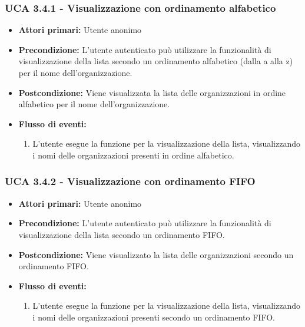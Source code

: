 \subsubsection{UCA 3.4.1 - Visualizzazione con ordinamento alfabetico}%
\begin{itemize}
	\item \textbf{Attori primari:} Utente anonimo
	\item \textbf{Precondizione:} L'utente autenticato può utilizzare la funzionalità di visualizzazione della lista secondo un ordinamento alfabetico (dalla a alla z) per il nome dell'organizzazione.
	\item \textbf{Postcondizione:} Viene visualizzata la lista delle organizzazioni in ordine alfabetico per il nome dell'organizzazione.
	\item \textbf{Flusso di eventi:}
	\begin{enumerate}
		\item L'utente esegue la funzione per la visualizzazione della lista, visualizzando i nomi delle organizzazioni presenti in ordine alfabetico.
	\end{enumerate}
\end{itemize}

\subsubsection{UCA 3.4.2 - Visualizzazione con ordinamento FIFO}%
\begin{itemize}	
	\item \textbf{Attori primari:} Utente anonimo
	\item \textbf{Precondizione:} L'utente autenticato può utilizzare la funzionalità di visualizzazione della lista secondo un ordinamento FIFO.
	\item \textbf{Postcondizione:} Viene visualizzato la lista delle organizzazioni secondo un ordinamento FIFO.
	\item \textbf{Flusso di eventi:}
		\begin{enumerate}
		\item L'utente esegue la funzione per la visualizzazione della lista, visualizzando i nomi delle organizzazioni presenti secondo un ordinamento FIFO.
	\end{enumerate}
\end{itemize}

